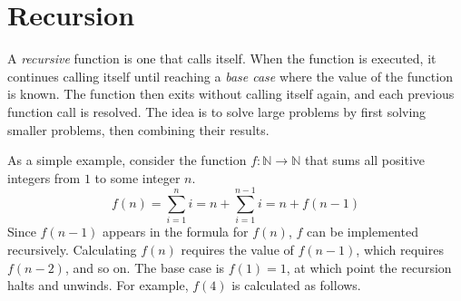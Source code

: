 

\section*{Recursion} %

A \emph{recursive} function is one that calls itself. 
When the function is executed, it continues calling itself until reaching a \emph{base case} where the value of the function is known. 
The function then exits without calling itself again, and each previous function call is resolved. 
The idea is to solve large problems by first solving smaller problems, then combining their results.

As a simple example, consider the function $f:\mathbb{N}\rightarrow\mathbb{N}$ that sums all positive integers from $1$ to some integer $n$. 
\[
f(n) = \sum_{i=1}^ni = n + \sum_{i=1}^{n-1}i = n + f(n-1)
\]
Since $f(n-1)$ appears in the formula for $f(n)$, $f$ can be implemented recursively.
Calculating $f(n)$ requires the value of $f(n - 1)$, which requires $f(n - 2)$, and so on.
The base case is $f(1) = 1$, at which point the recursion halts and unwinds.
For example, $f(4)$ is calculated as follows.


